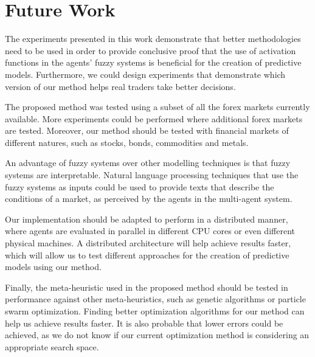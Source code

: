 \documentclass{ieeeaccess}
\begin{document}
\section{Future Work}
\label{section:future-work}

The experiments presented in this work demonstrate that better
methodologies need to be used in order to provide conclusive proof
that the use of activation functions in the agents' fuzzy systems is
beneficial for the creation of predictive models. Furthermore, we
could design experiments that demonstrate which version of our method
helps real traders take better decisions.

The proposed method was tested using a subset of all the forex markets
currently available. More experiments could be performed where
additional forex markets are tested. Moreover, our method should be
tested with financial markets of different natures, such as stocks,
bonds, commodities and metals.

An advantage of fuzzy systems over other modelling techniques is that
fuzzy systems are interpretable. Natural language processing
techniques that use the fuzzy systems as inputs could be used to
provide texts that describe the conditions of a market, as perceived
by the agents in the multi-agent system.

Our implementation should be adapted to perform in a distributed
manner, where agents are evaluated in parallel in different CPU cores
or even different physical machines. A distributed architecture will
help achieve results faster, which will allow us to test different
approaches for the creation of predictive models using our method.

Finally, the meta-heuristic used in the proposed method should be
tested in performance against other meta-heuristics, such as genetic
algorithms or particle swarm optimization. Finding better optimization
algorithms for our method can help us achieve results faster. It is
also probable that lower errors could be achieved, as we do not know
if our current optimization method is considering an appropriate
search space.



\end{document}
